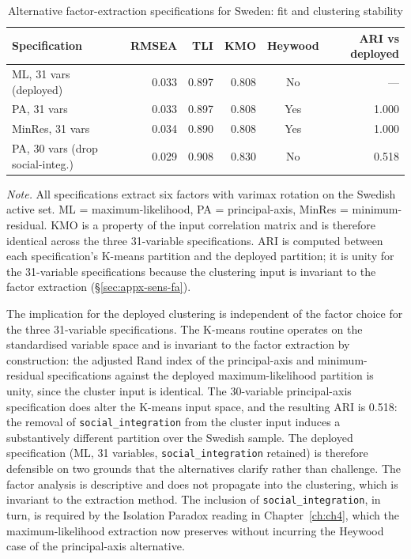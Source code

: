 \begin{table}[!htbp]
  \centering
  \small
  \caption[Swedish factor-extraction comparison]{Alternative factor-extraction specifications for Sweden: fit and clustering stability}
  \label{tab:appx-fa-extraction}
  \renewcommand{\arraystretch}{1.2}
  \setlength{\tabcolsep}{6pt}
  \begin{tabular}{@{}lrrrcr@{}}
    \toprule
    \textbf{Specification} & \textbf{RMSEA} & \textbf{TLI} & \textbf{KMO} & \textbf{Heywood} & \textbf{ARI vs deployed} \\
    \midrule
    ML, 31 vars (deployed)              & 0.033 & 0.897 & 0.808 & No  &---\\
    PA, 31 vars                         & 0.033 & 0.897 & 0.808 & Yes & 1.000 \\
    MinRes, 31 vars                     & 0.034 & 0.890 & 0.808 & Yes & 1.000 \\
    PA, 30 vars (drop social-integ.)    & 0.029 & 0.908 & 0.830 & No  & 0.518 \\
    \bottomrule
  \end{tabular}
  \par\medskip
  \begin{minipage}{\linewidth}
    \footnotesize\textit{Note.} All specifications extract six factors with varimax rotation on the Swedish active set. ML = maximum-likelihood, PA = principal-axis, MinRes = minimum-residual. KMO is a property of the input correlation matrix and is therefore identical across the three 31-variable specifications. ARI is computed between each specification's K-means partition and the deployed partition; it is unity for the 31-variable specifications because the clustering input is invariant to the factor extraction (\S\ref{sec:appx-sens-fa}).
  \end{minipage}
\end{table}

The implication for the deployed clustering is independent of the factor choice for the three 31-variable specifications. The K-means routine operates on the standardised variable space and is invariant to the factor extraction by construction: the adjusted Rand index of the principal-axis and minimum-residual specifications against the deployed maximum-likelihood partition is unity, since the cluster input is identical. The 30-variable principal-axis specification does alter the K-means input space, and the resulting ARI is 0.518: the removal of \texttt{social\_integration} from the cluster input induces a substantively different partition over the Swedish sample. The deployed specification (ML, 31 variables, \texttt{social\_integration} retained) is therefore defensible on two grounds that the alternatives clarify rather than challenge. The factor analysis is descriptive and does not propagate into the clustering, which is invariant to the extraction method. The inclusion of \texttt{social\_integration}, in turn, is required by the Isolation Paradox reading in Chapter~\ref{ch:ch4}, which the maximum-likelihood extraction now preserves without incurring the Heywood case of the principal-axis alternative.



